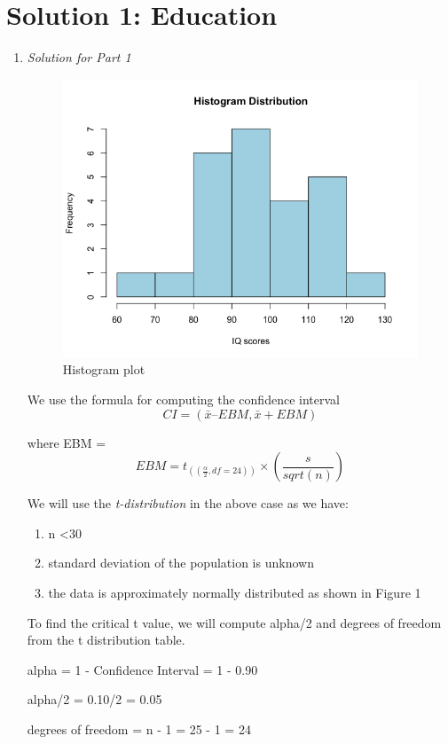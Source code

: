 \documentclass[12pt,letterpaper]{article}
\begin{document}
\section*{Solution 1: Education}

\vspace{3mm}
\begin{enumerate}
    \item \textit{Solution for Part 1}
    
       \begin{figure}[h]
              \centering
              \includegraphics[width=0.5\linewidth]{images/histogram_plot.png}
              \caption{Histogram plot}
          \end{figure}
    
    We use the formula for computing the confidence interval
            \[ CI = (\bar{x} – EBM, \bar{x} + EBM) \]

       where EBM = 
        \[ EBM =  t_(\left(\frac{\alpha}{2}, df=24\right)) \times \left(\frac{s}{sqrt(n)}\right) \]

    We will use the \textit{t-distribution} in the above case as we have:

        \begin{enumerate}
          \item n \textless 30
          \item standard deviation of the population is unknown
          \item the data is approximately normally distributed as shown in Figure 1
        \end{enumerate}


    To find the critical t value, we will compute alpha/2 and degrees of freedom from the t distribution table. 

        alpha = 1 - Confidence Interval = 1 - 0.90 
        
        alpha/2 = 0.10/2 = 0.05

        degrees of freedom = n - 1 = 25 - 1 = 24


\end{enumerate}
\end{document}
